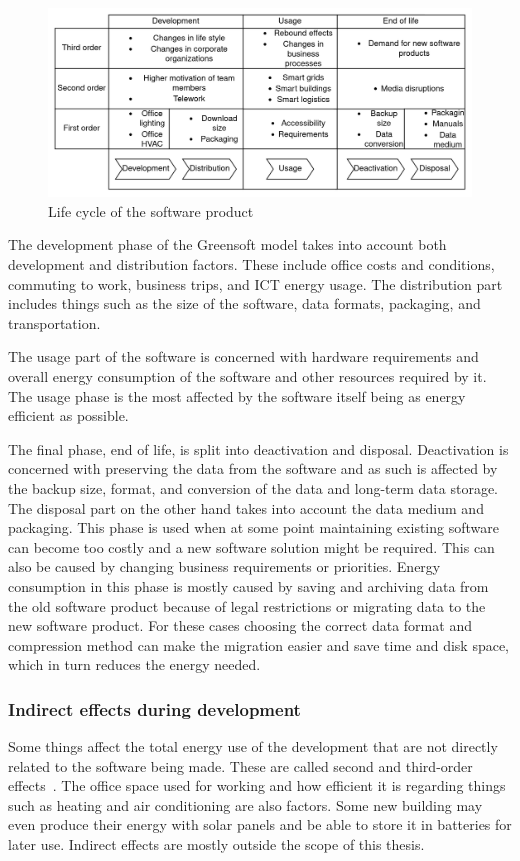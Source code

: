 \begin{figure}[H]
\caption{Life cycle of the software product}
\label{lifecycle}
\includegraphics[width=\textwidth]{images/lifecycle.png}
\centering
\end{figure}

The development phase of the Greensoft model takes into account both development and distribution factors. These include office costs and conditions, commuting to work, business trips, and ICT energy usage. The distribution part includes things such as the size of the software, data formats, packaging, and transportation.

The usage part of the software is concerned with hardware requirements and overall energy consumption of the software and other resources required by it. The usage phase is the most affected by the software itself being as energy efficient as possible.

The final phase, end of life, is split into deactivation and disposal. Deactivation is concerned with preserving the data from the software and as such is affected by the backup size, format, and conversion of the data and long-term data storage. The disposal part on the other hand takes into account the data medium and packaging. This phase is used when at some point maintaining existing software can become too costly and a new software solution might be required. This can also be caused by changing business requirements or priorities. Energy consumption in this phase is mostly caused by saving and archiving data from the old software product because of legal restrictions or migrating data to the new software product. For these cases choosing the correct data format and compression method can make the migration easier and save time and disk space, which in turn reduces the energy needed.

\subsubsection{Indirect effects during development}
Some things affect the total energy use of the development that are not directly related to the software being made. These are called second and third-order effects~\cite{greensoft}. The office space used for working and how efficient it is regarding things such as heating and air conditioning are also factors. Some new building may even produce their energy with solar panels and be able to store it in batteries for later use. Indirect effects are mostly outside the scope of this thesis.


